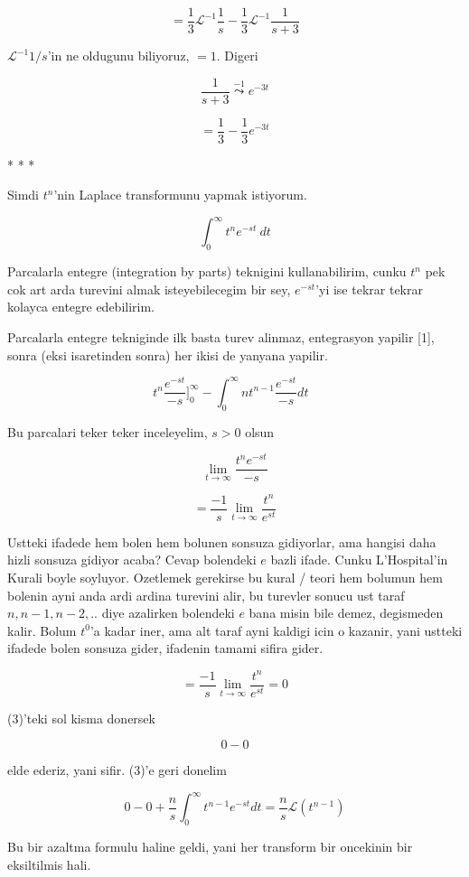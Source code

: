 \documentclass[12pt,fleqn]{article}\usepackage{../common}
\begin{document}
\[ = \frac{1}{3} \mathcal{L}^{-1}\frac{1}{s}  - 
\frac{1}{3} \mathcal{L}^{-1}\frac{1}{s+3}  
\]

$\mathcal{L}^{-1}1/s$'in ne oldugunu biliyoruz, $=1$. Digeri

\[ \frac{1}{s+3} \stackrel{-1}{\leadsto} e^{-3t} \]

\[ =  
\frac{1}{3} - \frac{1}{3} e^{-3t}
\]

* * * 

Simdi $t^n$'nin Laplace transformunu yapmak istiyorum. 

\[ \int_0^{\infty} t^ne^{-st} \ dt \]

Parcalarla entegre (integration by parts) teknigini kullanabilirim, cunku
$t^n$ pek cok art arda turevini almak isteyebilecegim bir sey, $e^{-st}$'yi
ise tekrar tekrar kolayca entegre edebilirim. 

Parcalarla entegre tekniginde ilk basta turev alinmaz, entegrasyon yapilir [1],
sonra (eksi isaretinden sonra) her ikisi de yanyana yapilir. 

\[ t^n \frac{e^{-st}}{-s} \bigg]_{0}^{\infty}  - 
\int_{0}^{\infty} nt^{n-1} \frac{e^{-st}}{-s} dt
\ \ \ \label{3}
\] 

Bu parcalari teker teker inceleyelim, $s>0$ olsun

\[ \lim_{t \to \infty} \frac{t^n  e^{-st}}{-s}\] 

\[ = \frac{-1}{s}\lim_{t \to \infty} \frac{t^n}{ e^{st}}\] 

Ustteki ifadede hem bolen hem bolunen sonsuza gidiyorlar, ama hangisi daha
hizli sonsuza gidiyor acaba? Cevap bolendeki $e$ bazli ifade. Cunku
L'Hospital'in Kurali boyle soyluyor. Ozetlemek gerekirse bu kural / teori
hem bolumun hem bolenin ayni anda ardi ardina turevini alir, bu turevler
sonucu ust taraf $n,n-1,n-2,..$ diye azalirken bolendeki $e$ bana misin
bile demez, degismeden kalir. Bolum $t^0$'a kadar iner, ama alt taraf ayni
kaldigi icin o kazanir, yani ustteki ifadede bolen sonsuza gider, ifadenin
tamami sifira gider. 

\[ = \frac{-1}{s}\lim_{t \to \infty} \frac{t^n}{ e^{st}} = 0\] 

(3)'teki sol kisma donersek 

\[ 0 - 0  \]

elde ederiz, yani sifir. (3)'e geri donelim

\[ 0 - 0   +
\frac{n}{s} \int_{0}^{\infty} t^{n-1} e^{-st} dt = 
\frac{n}{s} \mathcal{L} (t^{n-1})
\]

Bu bir azaltma formulu haline geldi, yani her transform bir oncekinin bir
eksiltilmis hali. 
\end{document}
